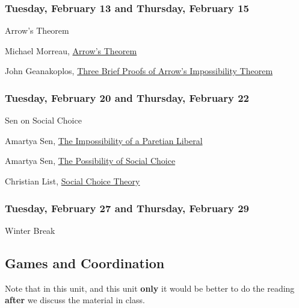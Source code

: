 \documentclass[
  12pt,
  letterpaper,
  DIV=11,
  numbers=noendperiod]{scrartcl}
\providecommand{\tightlist}{%
  \setlength{\itemsep}{0pt}\setlength{\parskip}{0pt}}\usepackage{longtable,booktabs,array}
\begin{document}
\subsubsection{Tuesday, February 13 and Thursday, February
15}\label{tuesday-february-13-and-thursday-february-15}

\begin{description}
\tightlist
\item[Topic]
Arrow's Theorem
\item[Reading]
Michael Morreau,
\href{https://plato.stanford.edu/entries/arrows-theorem/}{Arrow's
Theorem}
\item[Recommended Reading]
John Geanakoplos, \href{https://www.jstor.org/stable/25055941}{Three
Brief Proofs of Arrow's Impossibility Theorem}
\end{description}

\subsubsection{Tuesday, February 20 and Thursday, February
22}\label{tuesday-february-20-and-thursday-february-22}

\begin{description}
\tightlist
\item[Topic]
Sen on Social Choice
\item[Reading]
Amartya Sen, \href{https://www.jstor.org/stable/1829633}{The
Impossibility of a Paretian Liberal}

Amartya Sen, \href{https://www.jstor.org/stable/117024}{The Possibility
of Social Choice}
\item[Recommended Reading]
Christian List,
\href{https://plato.stanford.edu/entries/social-choice/}{Social Choice
Theory}
\end{description}

\subsubsection{Tuesday, February 27 and Thursday, February
29}\label{tuesday-february-27-and-thursday-february-29}

Winter Break

\subsection{Games and Coordination}\label{games-and-coordination}

Note that in this unit, and this unit \textbf{only} it would be better
to do the reading \textbf{after} we discuss the material in class.
\end{document}
